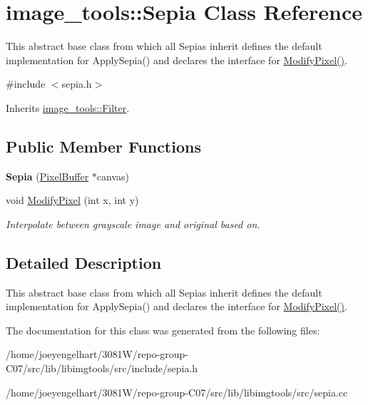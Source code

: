 \hypertarget{classimage__tools_1_1Sepia}{}\section{image\+\_\+tools\+:\+:Sepia Class Reference}
\label{classimage__tools_1_1Sepia}


This abstract base class from which all Sepias inherit defines the default implementation for Apply\+Sepia() and declares the interface for \hyperlink{classimage__tools_1_1Sepia_ab1dc8b8de4225b573a2a714fea402d61}{Modify\+Pixel()}.  




{\ttfamily \#include $<$sepia.\+h$>$}



Inherits \hyperlink{classimage__tools_1_1Filter}{image\+\_\+tools\+::\+Filter}.

\subsection*{Public Member Functions}
\begin{DoxyCompactItemize}
\item 
{\bfseries Sepia} (\hyperlink{classimage__tools_1_1PixelBuffer}{Pixel\+Buffer} $\ast$canvas)\hypertarget{classimage__tools_1_1Sepia_a8a88bcde22d13061b11a0685d2f4ad5a}{}\label{classimage__tools_1_1Sepia_a8a88bcde22d13061b11a0685d2f4ad5a}

\item 
void \hyperlink{classimage__tools_1_1Sepia_ab1dc8b8de4225b573a2a714fea402d61}{Modify\+Pixel} (int x, int y)\hypertarget{classimage__tools_1_1Sepia_ab1dc8b8de4225b573a2a714fea402d61}{}\label{classimage__tools_1_1Sepia_ab1dc8b8de4225b573a2a714fea402d61}

\begin{DoxyCompactList}\small\item\em Interpolate between grayscale image and original based on. \end{DoxyCompactList}\end{DoxyCompactItemize}


\subsection{Detailed Description}
This abstract base class from which all Sepias inherit defines the default implementation for Apply\+Sepia() and declares the interface for \hyperlink{classimage__tools_1_1Sepia_ab1dc8b8de4225b573a2a714fea402d61}{Modify\+Pixel()}. 

The documentation for this class was generated from the following files\+:\begin{DoxyCompactItemize}
\item 
/home/joeyengelhart/3081\+W/repo-\/group-\/\+C07/src/lib/libimgtools/src/include/sepia.\+h\item 
/home/joeyengelhart/3081\+W/repo-\/group-\/\+C07/src/lib/libimgtools/src/sepia.\+cc\end{DoxyCompactItemize}
